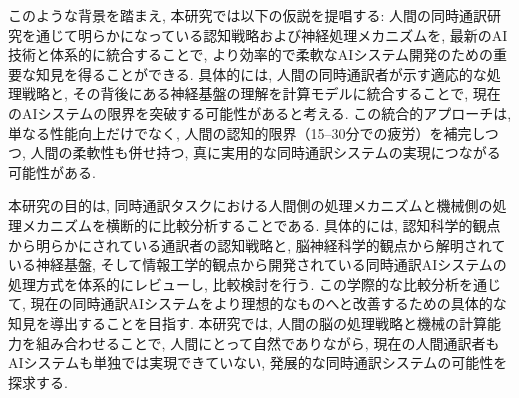 このような背景を踏まえ, 本研究では以下の仮説を提唱する: 人間の同時通訳研究を通じて明らかになっている認知戦略および神経処理メカニズムを, 最新のAI技術と体系的に統合することで, より効率的で柔軟なAIシステム開発のための重要な知見を得ることができる. 
具体的には, 人間の同時通訳者が示す適応的な処理戦略と, その背後にある神経基盤の理解を計算モデルに統合することで, 現在のAIシステムの限界を突破する可能性があると考える. 
この統合的アプローチは, 単なる性能向上だけでなく, 人間の認知的限界（15--30分での疲労）を補完しつつ, 人間の柔軟性も併せ持つ, 真に実用的な同時通訳システムの実現につながる可能性がある. 

本研究の目的は, 同時通訳タスクにおける人間側の処理メカニズムと機械側の処理メカニズムを横断的に比較分析することである. 
具体的には, 認知科学的観点から明らかにされている通訳者の認知戦略と, 脳神経科学的観点から解明されている神経基盤, そして情報工学的観点から開発されている同時通訳AIシステムの処理方式を体系的にレビューし, 比較検討を行う. 
この学際的な比較分析を通じて, 現在の同時通訳AIシステムをより理想的なものへと改善するための具体的な知見を導出することを目指す. 
本研究では, 人間の脳の処理戦略と機械の計算能力を組み合わせることで, 人間にとって自然でありながら, 現在の人間通訳者もAIシステムも単独では実現できていない, 発展的な同時通訳システムの可能性を探求する. 